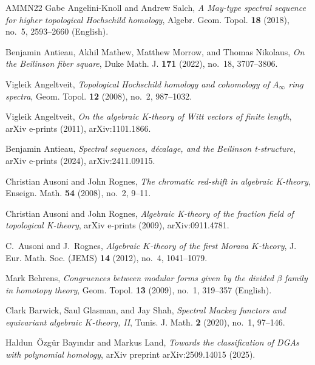 \documentclass[english,10pt]{amsart}
\theoremstyle{definition}
\numberwithin{equation}{section}
\begin{document}
{\begin{thebibliography}{AMMN22}
Gabe Angelini-Knoll and Andrew Salch, \emph{A {May}-type spectral sequence for higher topological {Hochschild} homology}, Algebr. Geom. Topol. \textbf{18} (2018), no.~5, 2593--2660 (English).

Benjamin Antieau, Akhil Mathew, Matthew Morrow, and Thomas Nikolaus, \emph{On the {B}eilinson fiber square}, Duke Math. J. \textbf{171} (2022), no.~18, 3707--3806. 

Vigleik Angeltveit, \emph{Topological {H}ochschild homology and cohomology of {$A_\infty$} ring spectra}, Geom. Topol. \textbf{12} (2008), no.~2, 987--1032. 

Vigleik {Angeltveit}, \emph{{On the algebraic K-theory of Witt vectors of finite length}}, arXiv e-prints (2011), arXiv:1101.1866.

Benjamin {Antieau}, \emph{{Spectral sequences, d{\'e}calage, and the Beilinson t-structure}}, arXiv e-prints (2024), arXiv:2411.09115.

Christian Ausoni and John Rognes, \emph{The chromatic red-shift in algebraic {K}-theory}, Enseign. Math. \textbf{54} (2008), no.~2, 9--11.

Christian {Ausoni} and John {Rognes}, \emph{{Algebraic K-theory of the fraction field of topological K-theory}}, arXiv e-prints (2009), arXiv:0911.4781.

C.~Ausoni and J.~Rognes, \emph{Algebraic {$K$}-theory of the first {M}orava {$K$}-theory}, J. Eur. Math. Soc. (JEMS) \textbf{14} (2012), no.~4, 1041--1079. 

Mark Behrens, \emph{Congruences between modular forms given by the divided {{\({{\beta}} \)}} family in homotopy theory}, Geom. Topol. \textbf{13} (2009), no.~1, 319--357 (English).

Clark Barwick, Saul Glasman, and Jay Shah, \emph{Spectral {M}ackey functors and equivariant algebraic {$K$}-theory, {II}}, Tunis. J. Math. \textbf{2} (2020), no.~1, 97--146. 

Haldun~{\"O}zg{\"u}r Bay{\i}nd{\i}r and Markus Land, \emph{Towards the classification of {DGA}s with polynomial homology}, arXiv preprint arXiv:2509.14015 (2025).


\end{thebibliography}}
\end{document}
